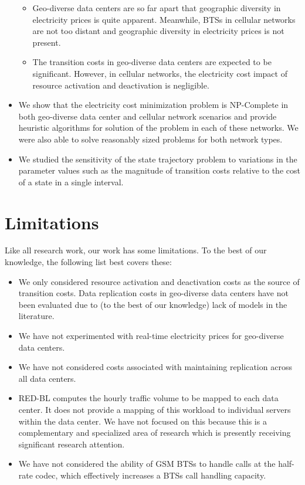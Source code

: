 \begin{itemize}
\begin{itemize}
	\item Geo-diverse data centers are so far apart that geographic diversity in electricity prices is quite apparent. Meanwhile, BTSs in cellular networks are not too distant and geographic diversity in electricity prices is not present.
	\item The transition costs in geo-diverse data centers are expected to be significant. However, in cellular networks, the electricity cost impact of resource activation and deactivation is negligible.
	\end{itemize}
\item We show that the electricity cost minimization problem is NP-Complete in both geo-diverse data center and cellular network scenarios and provide heuristic algorithms for solution of the problem in each of these networks. We were also able to solve reasonably sized problems for both network types.
\item We studied the sensitivity of the state trajectory problem to variations in the parameter values such as the magnitude of transition costs relative to the cost of a state in a single interval.
\end{itemize}

\section{Limitations} Like all research work, our work has some limitations. To the best of our knowledge, the following list best covers these:
\begin{itemize}
\item We only considered resource activation and deactivation costs as the source of transition costs. Data replication costs in geo-diverse data centers have not been evaluated due to (to the best of our knowledge) lack of models in the literature. 
\item We have not experimented with real-time electricity prices for geo-diverse data centers.
\item We have not considered costs associated with maintaining replication across all data centers.
\item RED-BL computes the hourly traffic volume to be mapped to each data center. It does not provide a mapping of this workload to individual servers within the data center. We have not focused on this because this is a complementary and specialized area of research which is presently receiving significant research attention.
\item We have not considered the ability of GSM BTSs to handle calls at the half-rate codec, which effectively increases a BTSs call handling capacity.
\end{itemize}

